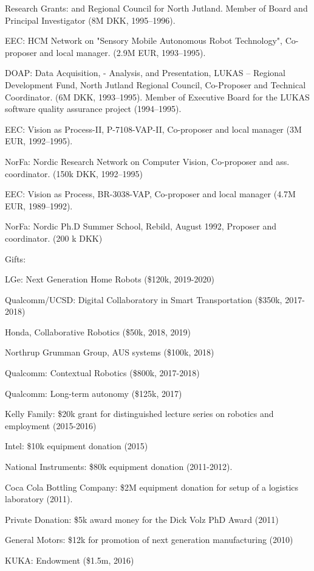 \documentclass{article}
\begin{document}
\begin{cv}
\begin{cvlist}{Research Grants:}
  and Regional Council for North Jutland. Member of Board and
  Principal Investigator (8M DKK, 1995--1996).%
\item EEC: HCM Network on "Sensory Mobile Autonomous Robot
  Technology", Co-proposer and local manager.  (2.9M EUR,
  1993--1995).%
\item DOAP: Data Acquisition, - Analysis, and Presentation, LUKAS --
  Regional Development Fund, North Jutland Regional Council,
  Co-Proposer and Technical Coordinator. (6M DKK, 1993--1995). Member
  of  Executive Board for the LUKAS software quality assurance project
  (1994--1995).%
\item EEC: Vision as Process-II, P-7108-VAP-II, Co-proposer and local
  manager (3M EUR, 1992--1995).%
\item NorFa: Nordic Research Network on Computer Vision, Co-proposer
  and ass. coordinator.  (150k DKK, 1992--1995)%
\item EEC: Vision as Process, BR-3038-VAP, Co-proposer and local
  manager (4.7M EUR, 1989--1992).%
\item NorFa: Nordic Ph.D Summer School, Rebild, August 1992, Proposer
  and coordinator. (200 k DKK)%
\end{cvlist}

\begin{cvlist}{Gifts:}
\item LGe: Next Generation Home Robots (\$120k, 2019-2020)
\item Qualcomm/UCSD: Digital Collaboratory in Smart Transportation
  (\$350k, 2017-2018)
\item Honda, Collaborative Robotics (\$50k, 2018, 2019)
\item Northrup Grumman Group, AUS systems (\$100k, 2018)
\item Qualcomm: Contextual Robotics (\$800k, 2017-2018)
\item Qualcomm: Long-term autonomy (\$125k, 2017)
\item Kelly Family: \$20k grant for distinguished lecture series on
  robotics and employment (2015-2016)
\item Intel: \$10k equipment donation (2015)
\item National Instruments: \$80k equipment donation (2011-2012).
\item Coca Cola Bottling Company: \$2M equipment donation for setup of
  a logistics laboratory (2011).
\item Private Donation: \$5k award money for the Dick Volz PhD Award
  (2011)
\item General Motors: \$12k for promotion of next generation
  manufacturing (2010)
\item KUKA: Endowment (\$1.5m, 2016)
\end{cvlist}


\end{cv}
\end{document}
